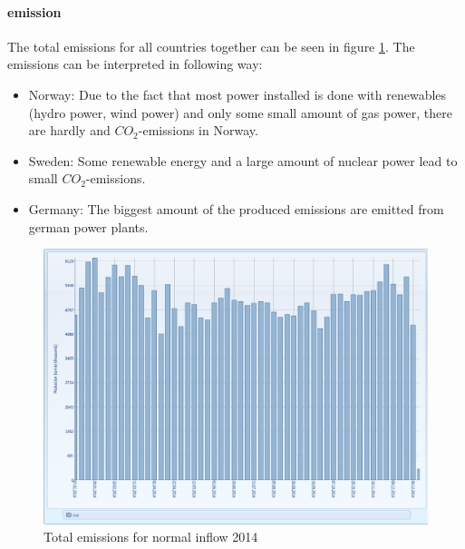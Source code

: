 \documentclass{article}
\begin{document}
\paragraph{emission\\}
The total emissions for all countries together can be seen in figure \ref{fig:MTemissionsnormal}. The emissions can be interpreted in following way:
\begin{itemize}
\item Norway: Due to the fact that most power installed is done with renewables (hydro power, wind power) and only some small amount of gas power, there are hardly and $CO_2$-emissions in Norway.
\item Sweden: Some renewable energy and a large amount of nuclear power lead to small $CO_2$-emissions. 
\item Germany: The biggest amount of the produced emissions are emitted from german power plants. 
\end{itemize}
\begin{figure}[htbp]
\begin{center}
\includegraphics[width=13cm,keepaspectratio=true]{figures/MTCO2}
\caption{Total emissions for normal inflow 2014}
\label{fig:MTemissionsnormal}
\end{center}
\end{figure}
\end{document}
